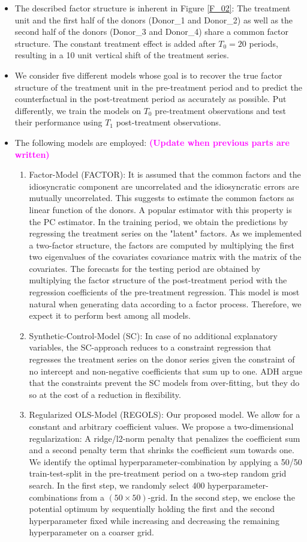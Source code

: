 \begin{itemize}
	\item The described factor structure is inherent in Figure \ref{F_02}: The treatment unit and the first half of the donors (Donor\_1 and Donor\_2) as well as the second half of the donors (Donor\_3 and Donor\_4) share a common factor structure. The constant treatment effect is added after $T_0 = 20$ periods, resulting in a 10 unit vertical shift of the treatment series.
	\item We consider five different models whose goal is to recover the true factor structure of the treatment unit in the pre-treatment period and to predict the counterfactual in the post-treatment period as accurately as possible. Put differently, we train the models on $T_0$ pre-treatment observations and test their performance using $T_1$ post-treatment observations.
	\item The following models are employed: \textcolor{magenta}{\textbf{(Update when previous parts are written)}}
	\begin{enumerate}
		\item Factor-Model (FACTOR): It is assumed that the common factors and the idiosyncratic component are uncorrelated and the idiosyncratic errors are mutually uncorrelated. This suggests to estimate the common factors as linear function of the donors. A popular estimator with this property is the \ac{PC} estimator. In the training period, we obtain the predictions by regressing the treatment series on the "latent" factors. As we implemented a two-factor structure, the factors are computed by multiplying the first two eigenvalues of the covariates covariance matrix with the matrix of the covariates. The forecasts for the testing period are obtained by multiplying the factor structure of the post-treatment period with the regression coefficients of the pre-treatment regression. This model is most natural when generating data according to a factor process. Therefore, we expect it to perform best among all models.
		\item Synthetic-Control-Model (SC): In case of no additional explanatory variables, the \ac{SC}-approach reduces to a constraint regression that regresses the treatment series on the donor series given the constraint of no intercept and non-negative coefficients that sum up to one. \ac{ADH} argue that the constraints prevent the SC models from over-fitting, but they do so at the cost of a reduction in flexibility.
		\item Regularized OLS-Model (REGOLS): Our proposed model. We allow for a constant and arbitrary coefficient values. We propose a two-dimensional regularization: A ridge/l2-norm penalty that penalizes the coefficient sum and a second penalty term that shrinks the coefficient sum towards one. We identify the optimal hyperparameter-combination by applying a 50/50 train-test-split in the pre-treatment period on a two-step random grid search. In the first step, we randomly select 400 hyperparameter-combinations from a $(50 \times 50)$-grid. In the second step, we enclose the potential optimum by sequentially holding the first and the second hyperparameter fixed while increasing and decreasing the remaining hyperparameter on a coarser grid. 

\end{enumerate}
\end{itemize}
